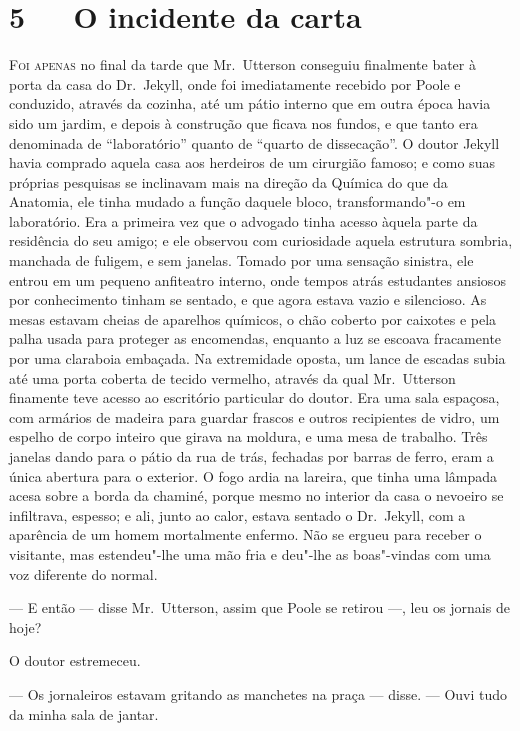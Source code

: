 \chapter[5\ \ \ O incidente da carta]{5\ \ \ O incidente da carta}

\textsc{Foi apenas} no final da tarde que Mr.~Utterson conseguiu finalmente bater
à porta da casa do Dr.~Jekyll, onde foi imediatamente recebido por
Poole e conduzido, através da cozinha, até um pátio interno que em
outra época havia sido um jardim, e depois à construção que ficava nos
fundos, e que tanto era denominada de “laboratório” quanto de “quarto
de dissecação”.  O doutor Jekyll havia comprado aquela casa aos
herdeiros de um cirurgião famoso; e como suas próprias pesquisas se
inclinavam mais na direção da Química do que da Anatomia, ele tinha
mudado a função daquele bloco, transformando"-o em laboratório.  Era a
primeira vez que o advogado tinha acesso àquela parte da residência do
seu amigo; e ele observou com curiosidade  aquela estrutura sombria,
manchada de fuligem, e sem janelas.  Tomado por uma sensação sinistra,
ele entrou em um pequeno anfiteatro interno, onde tempos atrás
estudantes ansiosos por conhecimento tinham se sentado, e que agora
estava vazio e silencioso.  As mesas estavam cheias de aparelhos
químicos, o chão coberto por caixotes e pela palha usada para proteger
as encomendas, enquanto a luz se escoava fracamente por uma claraboia
embaçada. Na extremidade oposta, um lance de escadas subia até uma
porta coberta de tecido vermelho, através da qual Mr.~Utterson
finamente teve acesso ao escritório particular do doutor.  Era uma sala
espaçosa, com armários de madeira para guardar frascos e outros
recipientes de vidro, um espelho de corpo inteiro que girava na
moldura, e uma mesa de trabalho.  Três janelas dando para o pátio da
rua de trás, fechadas por barras de ferro, eram a única abertura para o
exterior.  O fogo ardia na lareira, que tinha uma lâmpada acesa sobre a
borda da chaminé, porque mesmo no interior da casa o nevoeiro se
infiltrava, espesso; e ali, junto ao calor, estava sentado o Dr.~Jekyll, 
com a aparência de um homem mortalmente enfermo.  Não se ergueu
para receber o visitante, mas estendeu"-lhe uma mão fria e deu"-lhe as
boas"-vindas com uma voz diferente do normal.

--- E então --- disse Mr.~Utterson, assim que Poole se retirou ---, leu os
jornais de hoje?

O doutor estremeceu.

--- Os jornaleiros estavam gritando as manchetes na praça --- disse. ---
Ouvi tudo da minha sala de jantar.

